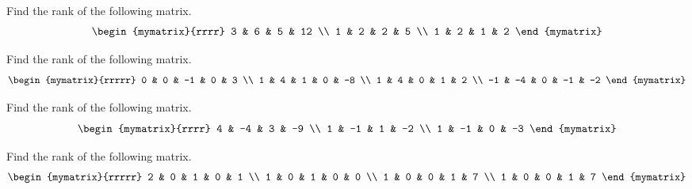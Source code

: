 \begin{ex} Find the rank of the following matrix.
\begin{equation*}
\begin{mymatrix}{rrrr}
3 & 6 & 5 & 12 \\
1 & 2 & 2 & 5 \\
1 & 2 & 1 & 2
\end{mymatrix}
\end{equation*}
\end{ex}

\begin{ex} Find the rank of the following matrix.
\begin{equation*}
\begin{mymatrix}{rrrrr}
0 & 0 & -1 & 0 & 3 \\
1 & 4 & 1 & 0 & -8 \\
1 & 4 & 0 & 1 & 2 \\
-1 & -4 & 0 & -1 & -2
\end{mymatrix}
\end{equation*}
\end{ex}

\begin{ex} Find the rank of the following matrix.
\begin{equation*}
\begin{mymatrix}{rrrr}
4 & -4 & 3 & -9 \\
1 & -1 & 1 & -2 \\
1 & -1 & 0 & -3
\end{mymatrix}
\end{equation*}
\end{ex}

\begin{ex} Find the rank of the following matrix.
\begin{equation*}
\begin{mymatrix}{rrrrr}
2 & 0 & 1 & 0 & 1 \\
1 & 0 & 1 & 0 & 0 \\
1 & 0 & 0 & 1 & 7 \\
1 & 0 & 0 & 1 & 7
\end{mymatrix}
\end{equation*}
\end{ex}

